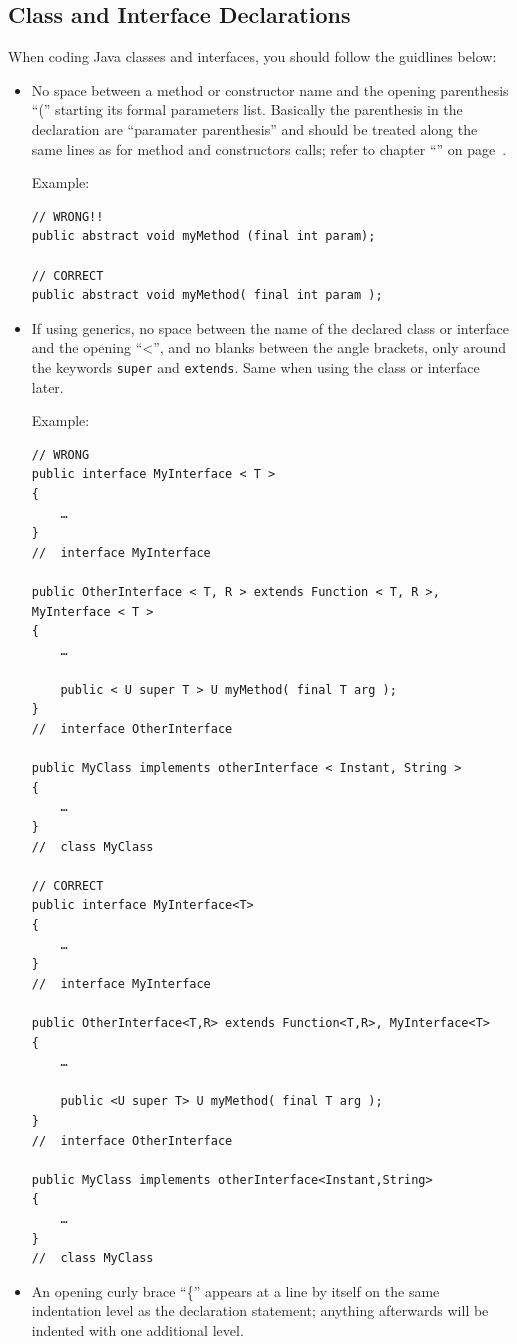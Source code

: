 \documentclass[11pt,a4paper, titlepage, parskip=half, headsepline, footsepline, cleardoublepage=current, headheight=1cm]{scrbook}
\begin{document}
\subsection{Class and Interface Declarations}
When coding Java classes and interfaces, you should follow the guidlines below:
\begin{itemize}
\item{No space between a method or constructor name and the opening parenthesis “(” starting its formal parameters list. Basically the parenthesis in the declaration are “paramater parenthesis” and should be treated along the same lines as for method and constructors calls; refer to chapter “” on page~\pageref{sec:ParameterParenthesis}.

Example:
\begin{lstlisting}
// WRONG!!
public abstract void myMethod (final int param);

// CORRECT
public abstract void myMethod( final int param );
\end{lstlisting}}

\item{If using generics, no space between the name of the declared class or interface and the opening “\textless”, and no blanks between the angle brackets, only around the keywords \lstinline|super| and \lstinline|extends|. Same when using the class or interface later.

Example:
\begin{lstlisting}
// WRONG
public interface MyInterface < T >
{ 
    … 
}
//  interface MyInterface

public OtherInterface < T, R > extends Function < T, R >, MyInterface < T >
{
    …
    
    public < U super T > U myMethod( final T arg );
}
//  interface OtherInterface

public MyClass implements otherInterface < Instant, String >
{
    …
}
//  class MyClass

// CORRECT
public interface MyInterface<T>
{ 
    … 
}
//  interface MyInterface

public OtherInterface<T,R> extends Function<T,R>, MyInterface<T>
{
    …
    
    public <U super T> U myMethod( final T arg );
}
//  interface OtherInterface

public MyClass implements otherInterface<Instant,String>
{
    …
}
//  class MyClass
\end{lstlisting}}

\item{An opening curly brace “\{” appears at a line by itself on the same indentation level as the declaration statement; anything afterwards will be indented with one additional level.

}
\end{itemize}
\end{document}
